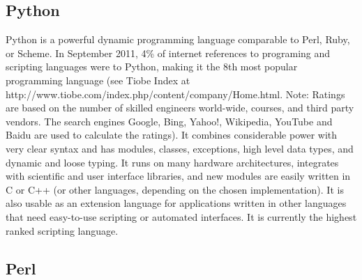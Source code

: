 \documentclass[10pt]{article}
\begin{document}



\subsection*{Python}

Python is a powerful dynamic programming language comparable to Perl,
Ruby, or Scheme. In September 2011, 4\% of internet references to programing and scripting languages were to Python, making it the 8th most popular programming
language (see Tiobe Index at http://www.tiobe.com/index.php/content/company/Home.html. Note: Ratings are based on the number of skilled engineers world-wide, courses, and third party vendors. The search engines Google, Bing, Yahoo!, Wikipedia, YouTube and Baidu are used to calculate the ratings).  It combines
considerable power with very clear syntax and has modules, classes,
exceptions, high level data types, and dynamic and loose typing. It
runs on many hardware architectures, integrates with scientific and
user interface libraries, and new modules are easily written in C or
C++ (or other languages, depending on the chosen implementation). It
is also usable as an extension language for applications written in
other languages that need easy-to-use scripting or automated
interfaces.  It is currently the highest ranked scripting language.


\subsection*{Perl}
\end{document}
